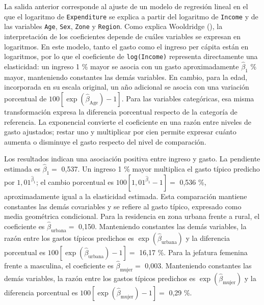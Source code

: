 \documentclass[
  spanish,
  11pt,
  letterpaper,
  oneside,
  open=any]{scrbook}
\begin{document}
La salida anterior corresponde al ajuste de un modelo de regresión
lineal en el que el logaritmo de \texttt{Expenditure} se explica a
partir del logaritmo de \texttt{Income} y de las variables \texttt{Age},
\texttt{Sex}, \texttt{Zone} y \texttt{Region}. Como explica Wooldridge
(), la interpretación de los
coeficientes depende de cuáles variables se expresan en logaritmos. En
este modelo, tanto el gasto como el ingreso per cápita están en
logaritmos, por lo que el coeficiente de \texttt{log(Income)} representa
directamente una elasticidad: un ingreso 1 \% mayor se asocia con un
gasto aproximadamente \(\hat\beta_1\) \% mayor, manteniendo constantes
las demás variables. En cambio, para la edad, incorporada en su escala
original, un año adicional se asocia con una variación porcentual de
\(100[\exp(\hat\beta_{\mathrm{Age}})-1]\). Para las variables
categóricas, esa misma transformación expresa la diferencia porcentual
respecto de la categoría de referencia. La exponencial convierte el
coeficiente en una razón entre niveles de gasto ajustados; restar uno y
multiplicar por cien permite expresar cuánto aumenta o disminuye el
gasto respecto del nivel de comparación.

Los resultados indican una asociación positiva entre ingreso y gasto. La
pendiente estimada es \(\hat\beta_1=\) 0,537. Un ingreso 1 \% mayor
multiplica el gasto típico predicho por \(1{,}01^{\hat\beta_1}\); el
cambio porcentual es \(100[1{,}01^{\hat\beta_1}-1]=\) 0,536 \%,
aproximadamente igual a la elasticidad estimada. Esta comparación
mantiene constantes las demás covariables y se refiere al gasto típico,
expresado como media geométrica condicional. Para la residencia en zona
urbana frente a rural, el coeficiente es
\(\hat\beta_{\mathrm{urbana}}=\) 0,150. Manteniendo constantes las demás
variables, la razón entre los gastos típicos predichos es
\(\exp(\hat\beta_{\mathrm{urbana}})\) y la diferencia porcentual es
\(100[\exp(\hat\beta_{\mathrm{urbana}})-1]=\) 16,17 \%. Para la jefatura
femenina frente a masculina, el coeficiente es
\(\hat\beta_{\mathrm{mujer}}=\) 0,003. Manteniendo constantes las demás
variables, la razón entre los gastos típicos predichos es
\(\exp(\hat\beta_{\mathrm{mujer}})\) y la diferencia porcentual es
\(100[\exp(\hat\beta_{\mathrm{mujer}})-1]=\) 0,29 \%.
\end{document}
